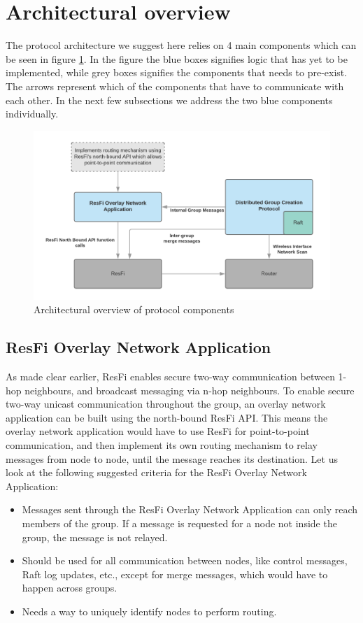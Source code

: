 \section{Architectural overview}
The protocol architecture we suggest here relies on 4 main components which can be seen in figure \ref{fig:dgcpoverview}.
In the figure the blue boxes signifies logic that has yet to be implemented, while grey boxes signifies the components that needs to pre-exist. The arrows
represent which of the components that have to communicate with each other. In the next few subsections we address the two blue components individually.

\begin{figure}
	\includegraphics[width=\textwidth]{Images/dgcpoverview.png}
		\caption{Architectural overview of protocol components }%
		\label{fig:dgcpoverview}%
\end{figure}


\subsection{ResFi Overlay Network Application}
As made clear earlier, ResFi enables secure two-way communication between 1-hop neighbours, and broadcast messaging via n-hop neighbours. 
To enable secure two-way unicast communication throughout the group, an overlay network application can be built using the north-bound ResFi API. 
This means the overlay network application would have to use ResFi for point-to-point communication, and then implement its own routing mechanism
to relay messages from node to node, until the message reaches its destination. Let us look at the following suggested criteria for the ResFi Overlay Network Application:

\begin{itemize}
	\item Messages sent through the ResFi Overlay Network Application can only reach members of the group. If a message is requested for a node not inside the group,
		the message is not relayed.
  \item Should be used for all communication between nodes, like control messages, Raft log updates, etc., except for merge messages, which would have to happen across
		groups. 
	\item Needs a way to uniquely identify nodes to perform routing.
\end{itemize}


